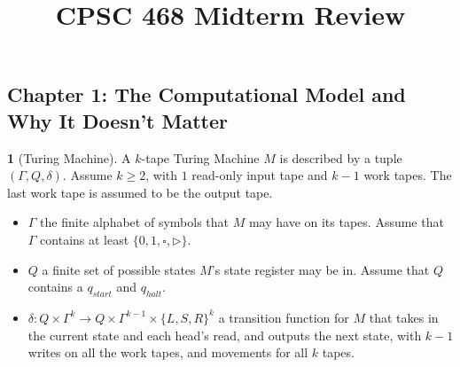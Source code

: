 \documentclass[10pt]{article}
\title{CPSC 468 Midterm Review}
\author{}
\date{}
\theoremstyle{definition}
\newtheorem{note}{}[section]
\begin{document}
\maketitle

\newcommand{\E}{\mathrm{E}}
\newcommand{\Var}{\mathrm{Var}}
\newcommand{\Real}{\mathrm{Re}}
\newcommand{\Imag}{\mathrm{Im}}
\newcommand{\res}{\mathrm{res}}
\newcommand{\NP}{\mathrm{NP}}
\newcommand{\NPC}{\mathrm{NP\mhyphen Complete}}
\newcommand{\coNP}{\mathrm{coNP}}
\newcommand{\coNPC}{\mathrm{coNP\mhyphen Complete}}
\newcommand{\DP}{\mathrm{DP}}
\newcommand{\PTIME}{\mathrm{P}}
\newcommand{\AL}{\mathrm{AL}}
\newcommand{\INDSET}{\mathrm{INDSET}}
\newcommand{\NOTINDSET}{\overline{\mathrm{INDSET}}}
\newcommand{\EXACTINDSET}{\mathrm{EXACT\mhyphen INDSET}}
\newcommand{\SAT}{\mathrm{SAT}}
\newcommand{\UNSAT}{\overline{\mathrm{SAT}}}
\newcommand{\TMSAT}{\mathrm{TMSAT}}
\newcommand{\ACCEPT}{\mathrm{ACCEPT}}
\newcommand{\REJECT}{\mathrm{REJECT}}
\newcommand{\DTIME}{\mathrm{DTIME}}
\newcommand{\NTIME}{\mathrm{NTIME}}
\newcommand{\EXP}{\mathrm{EXP}}
\newcommand{\NEXP}{\mathrm{NEXP}}
\newcommand{\SPACE}{\mathrm{SPACE}}
\newcommand{\PSPACE}{\mathrm{PSPACE}}
\newcommand{\NSPACE}{\mathrm{NSPACE}}

\newcommand{\st}{\mathrm{\ s.t.\ }}

\subsection*{Chapter 1: The Computational Model and Why It Doesn't Matter}
\begin{note}[Turing Machine]
  A $k$-tape Turing Machine $M$ is described by a tuple $(\Gamma, Q, \delta)$.
  Assume $k \geq 2$, with $1$ read-only input tape and $k - 1$ work tapes.
  The last work tape is assumed to be the output tape.
  \begin{itemize}
    \item
      $\Gamma$ the finite alphabet of symbols that $M$ may have on its tapes.
      Assume that $\Gamma$ contains at least $\{0,1,\square,\triangleright\}$.

    \item
      $Q$ a finite set of possible states $M$'s state register may be in.
      Assume that $Q$ contains a $q_{start}$ and $q_{halt}$.

    \item
      $\delta : Q \times \Gamma^k \to Q
      \times \Gamma^{k - 1} \times \{L, S, R\}^k$ a transition function for
      $M$ that takes in the current state and each head's read, and outputs
      the next state, with $k - 1$ writes on all the work tapes, and movements
      for all $k$ tapes.
  \end{itemize}
\end{note}
\end{document}
